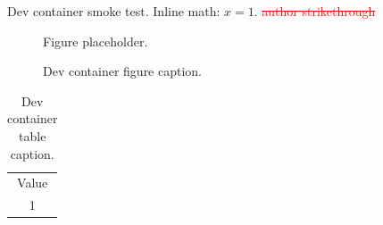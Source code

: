 \documentclass{article}
\begin{document}
Dev container smoke test. Inline math: $x=1$.
\ifdefined\DIFadd
{}
\fi
\textcolor{red}{\sout{author strikethrough}}
\begin{figure}
\centering Figure placeholder.
\caption{Dev container figure caption.}
\end{figure}
\begin{table}
\centering
\begin{tabular}{c}Value\\1\end{tabular}
\caption{Dev container table caption.}
\end{table}
\end{document}
